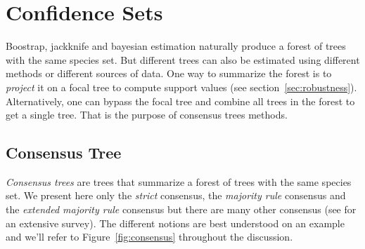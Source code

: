 \section{Confidence Sets} \label{sec:confidence}

Boostrap, jackknife and bayesian estimation naturally produce a forest of trees with the same species set. But different trees can also be estimated using different methods or different sources of data. One way to summarize the forest is to \emph{project} it on a focal tree to compute support values (see section~\ref{sec:robustness}). Alternatively, one can bypass the focal tree and combine all trees in the forest to get a single tree. That is the purpose of consensus trees methods. 

\subsection{Consensus Tree} \label{sec:consensus-tree}

\emph{Consensus trees} are trees that summarize a forest of trees with the same species set. We present here only the \emph{strict} consensus, the \emph{majority rule} consensus and the \emph{extended majority rule} consensus but there are many other consensus (see \citet{Bryant2003} for an extensive survey). The different notions are best understood on an example and we'll refer to Figure~\ref{fig:consensus} throughout the discussion. 

